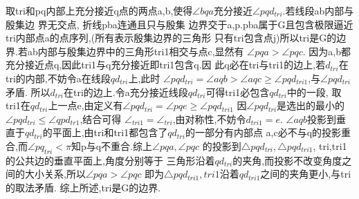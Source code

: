 \documentclass[a4paper]{book}
\numberwithin{equation}{chapter}
\theoremstyle{definition}
\begin{document}
取tri和pq内部上充分接近q点的两点a,b,使得$\angle bqa$充分接近$\angle pqd_{tri}$.若线段ab内部与殷集边
界无交点,
折线pba连通且只与殷集
边界交于a,p.pba属于G且包含极限逼近tri内部点a的点序列,(所有表示殷集边界的三角形
只有tri包含点j)所以tri是G的边界.若ab内部与殷集边界中的三角形tri1相交与点c,显然有
$\angle pqa > \angle pqc$.
因为a,b都充分接近点q,因此tri1与q充分接近即tri1包含q.因
此q必在tri与tri1的边上,若$d_{tri}$在tri的内部,不妨令a在线段$qd_{tri}$上,此时
$\angle pqd_{tri} = \angle aqb > \angle aqc \geq \angle pqd_{tri1}$,与$\angle pqd_{tri}$矛盾.
所以$d_{tri}$在tri的边上.令a充分接近线段$qd_{tri}$可得tri1必包含$qd_{tri}$中的一段,
取tri1在$qd_{tri}$上一点e,由定义有$\angle pqd_{tri} = \angle pqe \geq \angle pqd_{tri1}$
因$\angle pqd_{tri}$是选出的最小的$\angle pqd_{tri} \leq \angle qpd_{tr1}$,结合可得
$\angle_{tri1} = \angle_{tri}$,由对称性,不妨令$d_{tri1} = e$.
$\angle aqb$投影到垂直于$qd_{tri}$的平面上,由tri和tri1都包含了$qd_{tri}$的一部分有内部点
a,c必不与q的投影重合,而$\angle pq_{tri} < \pi$知p与q不重合.综上$\angle pqa,\angle pqc$
的投影到$\triangle pqd_{tri}, \triangle pqd_{tri1}$, tri,tri1的公共边的垂直平面上,角度分别等于
三角形沿着$qd_{tri}$的夹角,而投影不改变角度之间的大小关系,所以$\angle pqa > \angle pqc$
即为$\triangle pqd_{tri1}, tri1$沿着$qd_{tri1}$之间的夹角更小,与tri的取法矛盾.
综上所述,tri是G的边界.
\end{document}
